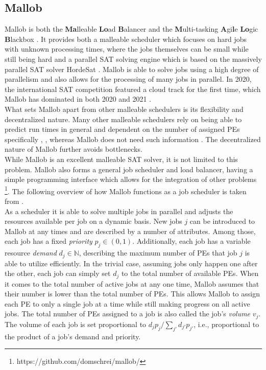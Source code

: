 \subsection{Mallob}
\label{prelim: mallob}
Mallob is both the \textbf{Ma}lleable \textbf{Lo}ad \textbf{B}alancer and the \textbf{M}ulti-tasking \textbf{A}gi\textbf{l}e \textbf{Lo}gic \textbf{B}lackbox \cite{schreiber2021scalable}.
It provides both a malleable scheduler which focuses on hard jobs with unknown processing times, where the jobs themselves can be small while still being hard \cite{sanders2022decentralized} and a parallel SAT solving engine which is based on the massively parallel SAT solver HordeSat \cite{balyo2015hordesat}.
Mallob is able to solve jobs using a high degree of parallelism and also allows for the processing of many jobs in parallel. In 2020, the international SAT competition featured a cloud track for the first time, which Mallob has dominated in both 2020 and 2021 \cite{froleyks2021sat, behnke2021satresults}. \\
What sets Mallob apart from other malleable schedulers is its flexibility and decentralized nature. Many other malleable schedulers rely on being able to predict run times in general and dependent on the number of assigned PEs specifically \cite{blazewicz2006preemptable}, \cite{sanders2011efficient}, whereas Mallob does not need such information \cite{sanders2022decentralized}. The decentralized nature of Mallob further avoids bottlenecks.
\\
While Mallob is an excellent malleable SAT solver, it is not limited to this problem. Mallob also forms a general job scheduler and load balancer, having a simple programming interface which allows for the integration of other problems \footnote{https://github.com/domschrei/mallob/}. The following overview of how Mallob functions as a job scheduler is taken from \cite{schreiber2021scalable}. \\
As a scheduler it is able to solve multiple jobs in parallel and adjusts the resources available per job on a dynamic basis. New jobs $j$ can be introduced to Mallob at any times and are described by a number of attributes. Among those, each job has a fixed \textit{priority} $p_j \in (0, 1)$. Additionally, each job has a variable resource \textit{demand} $d_j \in \mathbb{N}$, describing the maximum number of PEs that job $j$ is able to utilize efficiently. In the trivial case, assuming jobs only happen one after the other, each job can simply set $d_j$ to the total number of available PEs. When it comes to the total number of active jobs at any one time, Mallob assumes that their number is lower than the total number of PEs. This allows Mallob to assign each PE to only a single job at a time while still making progress on all active jobs. The total number of PEs assigned to a job is also called the job's \textit{volume} $v_j$. The volume of each job is set proportional to $d_j p_j / \sum_{j'} d_{j'} p_{j'}$, i.e., proportional to the product of a job's demand and priority.\\
